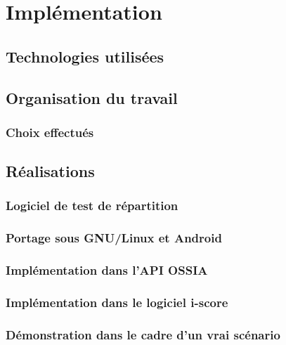 \chapter{Implémentation}
\label{chapterImpl}
\section{Technologies utilisées}

\section{Organisation du travail}
\subsection{Choix effectués}
\section{Réalisations}
\subsection{Logiciel de test de répartition}
\subsection{Portage sous GNU/Linux et Android}
\subsection{Implémentation dans l'API OSSIA} 
\subsection{Implémentation dans le logiciel i-score}
\subsection{Démonstration dans le cadre d'un vrai scénario}
